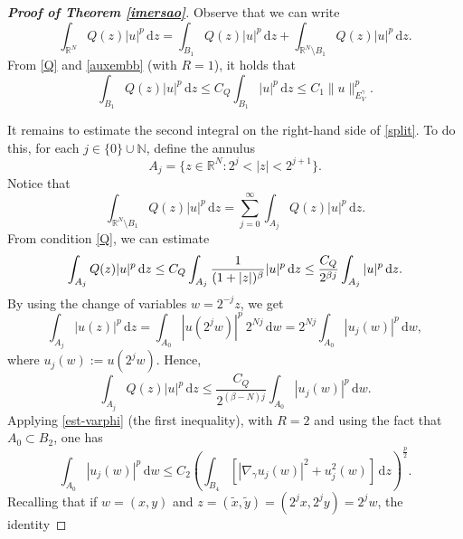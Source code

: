 \documentclass[12pt]{amsart}
\newcommand{\R}{\mathbb{R}}
\begin{document}
\begin{proof}[\textbf{\textit{Proof of Theorem \ref{imersao}}}]
	Observe that we can write
	\begin{equation}\label{split}
		\int_{\mathbb{R}^N}Q(z)|u|^p\,\mathrm{d}z = \int_{B_1}Q(z)|u|^p\,\mathrm{d}z + \int_{\mathbb{R}^N\setminus B_1}Q(z)|u|^p\,\mathrm{d}z .
	\end{equation}
From \ref{Q} and \eqref{auxembb} (with $R=1$), it holds that
\begin{equation}\label{ime-bola-Qp}
		\int_{B_1}Q(z)|u|^p\,\mathrm{d}z \leq C_Q\int_{B_1}|u|^p\,\mathrm{d}z \leq C_1\|u\|_{E_V^\gamma}^p.
	\end{equation}


It remains to estimate the second integral  on
	the right-hand side of \eqref{split}. To do this, for each $j\in\{0\}\cup\mathbb{N}$, define the annulus 	
	$$
	A_j = \{z\in\R^N: 2^j<|z|<2^{j+1}\}.
	$$
    Notice that
\begin{equation}\label{undersum}
		\int_{\mathbb{R}^N\setminus B_1}Q(z)|u|^p\,\mathrm{d}z = \sum_{j=0}^\infty \int_{A_j}Q(z)|u|^p\,\mathrm{d}z .
	\end{equation}
From condition \ref{Q}, we can estimate
\begin{equation*}\label{QAj}
		\int_{A_j}Q(z)|u|^p\,\mathrm{d}z 
		\leq  C_Q  \int_{A_j} \frac{1}{(1+|z|)^\beta} |u|^p\,\mathrm{d}z \\
		\leq   \frac{C_Q}{2^{\beta j}} \int_{A_j}  |u|^p\,\mathrm{d}z.
	\end{equation*}
By using the change of variables $w=2^{-j}z$, we get
	\begin{equation*}
		\int_{A_j}  |u(z)|^p\,\mathrm{d}z = \int_{A_0}  |u(2^jw)|^p\ 2^{Nj}\,\mathrm{d}w = 2^{Nj}  \int_{A_0}  |u_j(w)|^p \,\mathrm{d}w,
	\end{equation*}
where $u_j(w) := u(2^jw)$.  Hence,
	\begin{equation}\label{QAjA0}
		\int_{A_j}Q(z)|u|^p\,\mathrm{d}z  \leq   \frac{C_Q}{2^{(\beta-N) j}} \int_{A_0}  |u_j(w)|^p \,\mathrm{d}w .
	\end{equation}
Applying \eqref{est-varphi} (the first inequality), with $R=2$ and using the fact that $A_0 \subset B_2$, one has
\begin{equation}\label{imer-uj}
    \int_{A_0}  |u_j(w)|^p \,\mathrm{d}w \leq C_2\left(\int_{B_{4}} \left[\left|\nabla_\gamma u_j(w)\right|^2 + u_j^2(w)\right] \, \mathrm{d}z \right)^{\frac{p}{2}}.
\end{equation}
Recalling that if $w=(x,y)$ and $z=(\widetilde{x},\widetilde{y})=(2^jx,2^jy)= 2^jw$, the identity

\end{proof}
\end{document}
